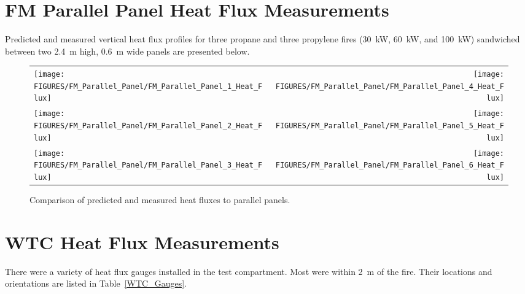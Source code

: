 \clearpage

\section{FM Parallel Panel Heat Flux Measurements}

Predicted and measured vertical heat flux profiles for three propane and three propylene fires (30~kW, 60~kW, and 100~kW) sandwiched between two 2.4~m high, 0.6~m wide panels are presented below.

\begin{figure}[h!]
\begin{tabular*}{\textwidth}{l@{\extracolsep{\fill}}r}
\texttt{[image: FIGURES/FM\_Parallel\_Panel/FM\_Parallel\_Panel\_1\_Heat\_Flux]} &
\texttt{[image: FIGURES/FM\_Parallel\_Panel/FM\_Parallel\_Panel\_4\_Heat\_Flux]} \\
\texttt{[image: FIGURES/FM\_Parallel\_Panel/FM\_Parallel\_Panel\_2\_Heat\_Flux]} &
\texttt{[image: FIGURES/FM\_Parallel\_Panel/FM\_Parallel\_Panel\_5\_Heat\_Flux]} \\
\texttt{[image: FIGURES/FM\_Parallel\_Panel/FM\_Parallel\_Panel\_3\_Heat\_Flux]} &
\texttt{[image: FIGURES/FM\_Parallel\_Panel/FM\_Parallel\_Panel\_6\_Heat\_Flux]}
\end{tabular*}
\label{FM_Parallel_Panel}
\caption[Side wall heat flux predictions, FM Parallel Panel experiments]
{Comparison of predicted and measured heat fluxes to parallel panels.}
\end{figure}



\clearpage

\section{WTC Heat Flux Measurements}

There were a variety of heat flux gauges installed in the test compartment. Most were within 2~m of the fire. Their locations and orientations are listed in Table~\ref{WTC_Gauges}.

